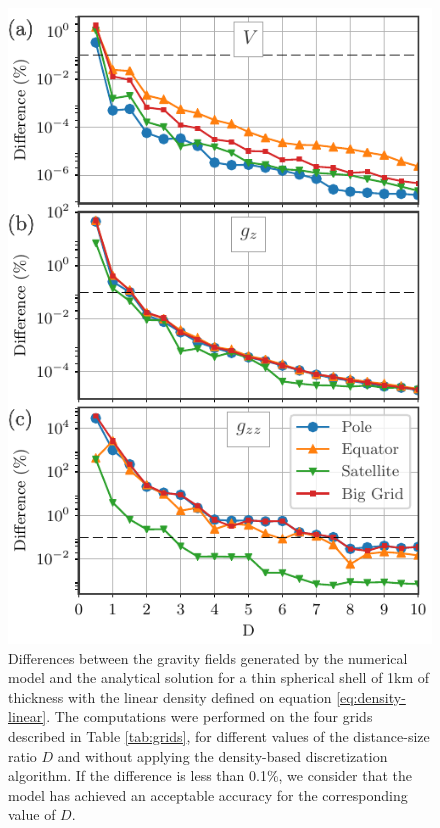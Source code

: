 \documentclass[extra]{gji}
\begin{document}
\begin{figure}
\centering
\includegraphics[width=0.9\linewidth]{figures/linear-D-thin.pdf}
\caption{
    Differences between the gravity fields generated by the numerical 
    model and the analytical solution for a thin spherical shell of 1km 
    of thickness with the linear density defined on equation 
    \ref{eq:density-linear}.
    The computations were performed on the four grids described in 
    Table \ref{tab:grids}, for different values of the distance-size 
    ratio $D$ and without applying the density-based discretization 
    algorithm.
    If the difference is less than 0.1\%, we consider that the model 
    has achieved an acceptable accuracy for the corresponding value of 
    $D$.
    }
\label{fig:D-linear-thin}
\end{figure}
\end{document}
